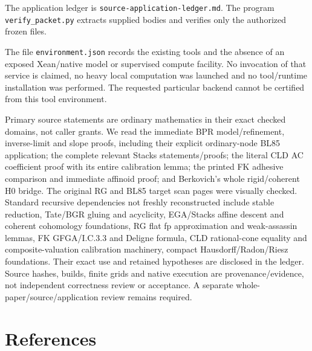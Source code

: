 \documentclass[
  11pt,
]{article}
\begin{document}
The application ledger is \texttt{source-application-ledger.md}. The
program \texttt{verify\_packet.py} extracts supplied bodies and verifies
only the authorized frozen files.

The file \texttt{environment.json} records the existing tools and the
absence of an exposed Xean/native model or supervised compute facility.
No invocation of that service is claimed, no heavy local computation was
launched and no tool/runtime installation was performed. The requested
particular backend cannot be certified from this tool environment.

Primary source statements are ordinary mathematics in their exact
checked domains, not caller grants. We read the immediate BPR
model/refinement, inverse-limit and slope proofs, including their
explicit ordinary-node BL85 application; the complete relevant Stacks
statements/proofs; the literal CLD AC coefficient proof with its entire
calibration lemma; the printed FK adhesive comparison and immediate
affinoid proof; and Berkovich's whole rigid/coherent H0 bridge. The
original RG and BL85 target scan pages were visually checked. Standard
recursive dependencies not freshly reconstructed include stable
reduction, Tate/BGR gluing and acyclicity, EGA/Stacks affine descent and
coherent cohomology foundations, RG flat fp approximation and
weak-assassin lemmas, FK GFGA/I.C.3.3 and Deligne formula, CLD
rational-cone equality and composite-valuation calibration machinery,
compact Hausdorff/Radon/Riesz foundations. Their exact use and retained
hypotheses are disclosed in the ledger. Source hashes, builds, finite
grids and native execution are provenance/evidence, not independent
correctness review or acceptance. A separate
whole-paper/source/application review remains required.

\section{References}\label{references}
\end{document}

